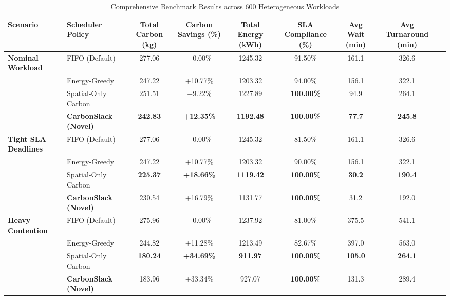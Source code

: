 \documentclass[conference]{IEEEtran}
\begin{document}
\begin{table}[t]
\centering
\caption{Comprehensive Benchmark Results across 600 Heterogeneous Workloads}
\label{tab:benchmark_results}
\begin{tabular}{llccccccc}
\toprule
\textbf{Scenario} & \textbf{Scheduler Policy} & \textbf{Total Carbon (kg)} & \textbf{Carbon Savings (\%)} & \textbf{Total Energy (kWh)} & \textbf{SLA Compliance (\%)} & \textbf{Avg Wait (min)} & \textbf{Avg Turnaround (min)} \\
\midrule
\textbf{Nominal Workload} 
 & FIFO (Default) & 277.06 & +0.00\% & 1245.32 & 91.50\% & 161.1 & 326.6 \\
 & Energy-Greedy & 247.22 & +10.77\% & 1203.32 & 94.00\% & 156.1 & 322.1 \\
 & Spatial-Only Carbon & 251.51 & +9.22\% & 1227.89 & \textbf{100.00\%} & 94.9 & 264.1 \\
 & \textbf{CarbonSlack (Novel)} & \textbf{242.83} & \textbf{+12.35\%} & \textbf{1192.48} & \textbf{100.00\%} & \textbf{77.7} & \textbf{245.8} \\
\midrule
\textbf{Tight SLA Deadlines} 
 & FIFO (Default) & 277.06 & +0.00\% & 1245.32 & 81.50\% & 161.1 & 326.6 \\
 & Energy-Greedy & 247.22 & +10.77\% & 1203.32 & 90.00\% & 156.1 & 322.1 \\
 & Spatial-Only Carbon & \textbf{225.37} & \textbf{+18.66\%} & \textbf{1119.42} & \textbf{100.00\%} & \textbf{30.2} & \textbf{190.4} \\
 & \textbf{CarbonSlack (Novel)} & 230.54 & +16.79\% & 1131.77 & \textbf{100.00\%} & 31.2 & 192.0 \\
\midrule
\textbf{Heavy Contention} 
 & FIFO (Default) & 275.96 & +0.00\% & 1237.92 & 81.00\% & 375.5 & 541.1 \\
 & Energy-Greedy & 244.82 & +11.28\% & 1213.49 & 82.67\% & 397.0 & 563.0 \\
 & Spatial-Only Carbon & \textbf{180.24} & \textbf{+34.69\%} & \textbf{911.97} & \textbf{100.00\%} & \textbf{105.0} & \textbf{264.1} \\
 & \textbf{CarbonSlack (Novel)} & 183.96 & +33.34\% & 927.07 & \textbf{100.00\%} & 131.3 & 289.4 \\
\bottomrule
\end{tabular}
\end{table}
\end{document}
